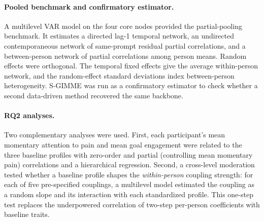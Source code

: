 \documentclass[11pt,a4paper]{article}
\begin{document}
\paragraph{Pooled benchmark and confirmatory estimator.} A multilevel VAR model
\citep{epskamp2018gaussian} on the four core nodes provided the partial-pooling benchmark. It
estimates a directed lag-1 temporal network, an undirected contemporaneous network of same-prompt
residual partial correlations, and a between-person network of partial correlations among person
means. Random effects were orthogonal. The temporal fixed effects give the average within-person
network, and the random-effect standard deviations index between-person heterogeneity. S-GIMME
\citep{lane2019uncovering} was run as a confirmatory estimator to check whether a second
data-driven method recovered the same backbone.

\paragraph{RQ2 analyses.} Two complementary analyses were used. First, each participant's mean
momentary attention to pain and mean goal engagement were related to the three baseline profiles
with zero-order and partial (controlling
mean momentary pain) correlations and a hierarchical regression. Second, a cross-level moderation
tested whether a baseline profile shapes the \emph{within-person} coupling strength: for each of
five pre-specified couplings, a multilevel model estimated the coupling as a random slope and its
interaction with each standardized profile. This one-step test replaces the underpowered
correlation of two-step per-person coefficients with baseline traits.
\end{document}
